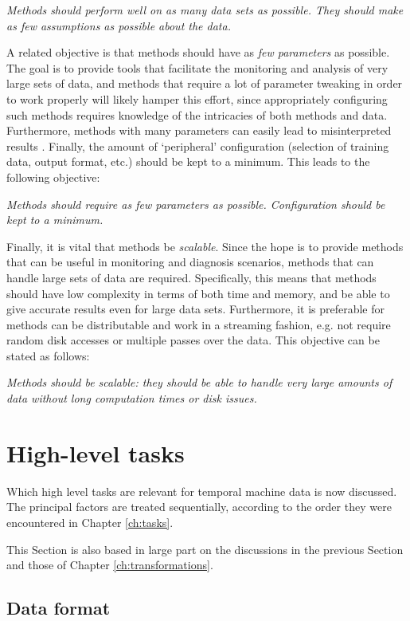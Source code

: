   \emph{Methods should perform well on as many data sets as possible. They should make as few assumptions as possible about the data.}

A related objective is that methods should have as \emph{few parameters} as possible. The goal is to provide tools that facilitate the monitoring and analysis of very large sets of data, and methods that require a lot of parameter tweaking in order to work properly will likely hamper this effort, since appropriately configuring such methods requires knowledge of the intricacies of both methods and data. Furthermore, methods with many parameters can easily lead to misinterpreted results \cite{keogh2}. Finally, the amount of `peripheral' configuration (selection of training data, output format, etc.) should be kept to a minimum. This leads to the following objective:

  \emph{Methods should require as few parameters as possible. Configuration should be kept to a minimum.}

Finally, it is vital that methods be \emph{scalable}. Since the hope is to provide methods that can be useful in monitoring and diagnosis scenarios, methods that can handle large sets of data are required. Specifically, this means that methods should have low complexity in terms of both time and memory, and be able to give accurate results even for large data sets. Furthermore, it is preferable for methods can be distributable and work in a streaming fashion, e.g. not require random disk accesses or multiple passes over the data. This objective can be stated as follows:

  \emph{Methods should be scalable: they should be able to handle very large amounts of data without long computation times or disk issues.}

\section{High-level tasks}
\label{sect:relevant_tasks}

Which high level tasks are relevant for temporal machine data is now discussed. The principal factors are treated sequentially, according to the order they were encountered in Chapter \ref{ch:tasks}.

This Section is also based in large part on the discussions in the previous Section and those of Chapter \ref{ch:transformations}. 

\subsection{Data format}
\label{sect:relevant_data_format}

